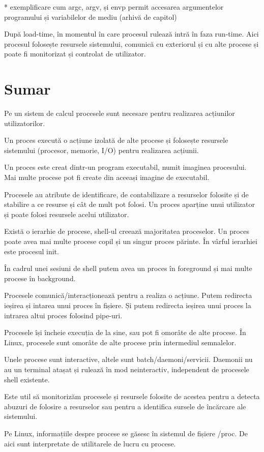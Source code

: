 * exemplificare cum argc, argv, și envp permit accesarea argumentelor programului și variabilelor de mediu (arhivă de capitol)

După load-time, în momentul în care procesul rulează intră în faza run-time.
Aici procesul folosește resursele sistemului, comunică cu exteriorul și cu alte
procese și poate fi monitorizat și controlat de utilizator.

\section{Sumar}
\label{sec:procese-sumar}

Pe un sistem de calcul procesele sunt necesare pentru realizarea acțiunilor
utilizatorilor.

Un proces execută o acțiune izolată de alte procese și folosește resursele
sistemului (procesor, memorie, I/O) pentru realizarea acțiunii.

Un proces este creat dintr-un program executabil, numit imaginea procesului. Mai
multe procese pot fi create din aceeași imagine de executabil.

Procesele au atribute de identificare, de contabilizare a resurselor folosite și
de stabilire a ce resurse și cât de mult pot folosi. Un proces aparține unui
utilizator și poate folosi resursele acelui utilizator.

Există o ierarhie de procese, shell-ul creează majoritatea proceselor. Un proces
poate avea mai multe procese copil și un singur proces părinte. În vârful
ierarhiei este procesul init.

În cadrul unei sesiuni de shell putem avea un proces în foreground și mai multe
procese în background.

Procesele comunică/interacționează pentru a realiza o acțiune. Putem redirecta
ieșirea și intarea unui proces în fișiere. Și putem redirecta ieșirea unui
proces la intrarea altui proces folosind pipe-uri.

Procesele își încheie execuția de la sine, sau pot fi omorâte de alte procese.
În Linux, procesele sunt omorâte de alte procese prin intermediul semnalelor.

Unele procese sunt interactive, altele sunt batch/daemoni/servicii. Daemonii nu
au un terminal atașat și rulează în mod neinteractiv, independent de procesele
shell existente.

Este util să monitorizăm procesele și resursele folosite de acestea pentru a
detecta abuzuri de folosire a resurselor sau pentru a identifica sursele de
încărcare ale sistemului.

Pe Linux, informațiile despre procese se găsesc în sistemul de fișiere /proc. De
aici sunt interpretate de utilitarele de lucru cu procese.
